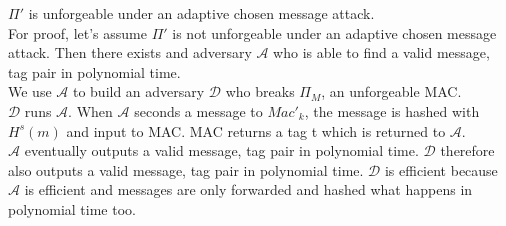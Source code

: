 $\Pi'$ is unforgeable under an adaptive chosen message attack.\\
For proof, let's assume $\Pi'$ is not unforgeable under an adaptive chosen message attack.
Then there exists and adversary $\mathcal{A}$ who is able to find a valid message, tag pair in polynomial time.\\
We use $\mathcal{A}$ to build an adversary $\mathcal{D}$ who breaks $\Pi_{M}$, an unforgeable MAC.\\
$\mathcal{D}$ runs $\mathcal{A}$. When $\mathcal{A}$ seconds a message to $Mac'_{k}$, the message is hashed with $H^{s}(m)$ and input to MAC. MAC returns a tag t which is returned to  $\mathcal{A}$.\\
$\mathcal{A}$ eventually outputs a valid message, tag pair in polynomial time.
$\mathcal{D}$ therefore also outputs a valid message, tag pair in polynomial time.
$\mathcal{D}$ is efficient because $\mathcal{A}$ is efficient and messages are only forwarded and hashed what happens in polynomial time too.

